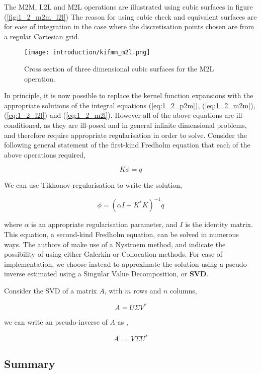 The M2M, L2L and M2L operations are illustrated using cubic surfaces in figure (\ref{fig:1_2_m2m_l2l})
The reason for using cubic check and equivalent surfaces are for ease of integration
in the case where the discretisation points chosen are from a regular Cartesian
grid.

\begin{figure}[!h]
    \centering
    {\texttt{[image: introduction/kifmm\_m2l.png]}}
    \caption{Cross section of three dimensional cubic surfaces for the M2L operation.}
  \label{fig:1_2_m2l}
\end{figure}

In principle, it is now possible to replace the kernel function expansions with
the appropriate solutions of the integral equations (\ref{eq:1_2_p2m}),
(\ref{eq:1_2_m2m}), (\ref{eq:1_2_l2l}) and (\ref{eq:1_2_m2l}). However all of
the above equations are ill-conditioned, as they are ill-posed and in general infinite
dimensional problems, and therefore require appropriate regularisation in order to solve.
Consider the following general statement of the first-kind Fredholm equation
that each of the above operations required,

\begin{equation}
K \phi = q
\label{eq:1_2_first_kind_fredholm}
\end{equation}

We can use Tikhonov regularisation to write the solution,

\begin{equation}
\phi = (\alpha I + K^*K)^{-1}q
\end{equation}

where $\alpha$ is an appropriate regularisation parameter, and $I$ is the identity
matrix. This equation, a second-kind Fredholm equation, can be solved in numerous
ways. The authors of \cite{Ying:2004:JCP} make use of a Nystroem method, and indicate
the possibility of using either Galerkin or Collocation methods. For ease of
implementation, we choose instead to approximate the solution using a pseudo-inverse
estimated using a Singular Value Decomposition, or \textbf{\gls{SVD}}.

Consider the SVD of a matrix $A$, with $m$ rows and $n$ columns,

\begin{equation}
    A = U \Sigma V^*
\end{equation}

we can write an pseudo-inverse of $A$ as \cite{Trefethen:1997:SIAM},

\begin{equation}
    A^\dagger = V \Sigma U^*
\end{equation}



\subsection{Summary}

